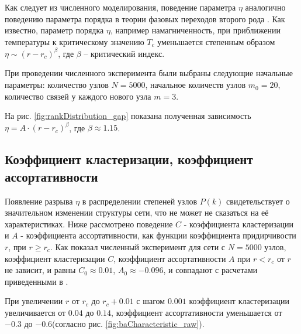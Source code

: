 \documentclass[10pt,aps,pra]{revtex4-1}
\begin{document}
        Как следует из численного моделирования, поведение параметра $\eta$ аналогично поведению параметра порядка в теории фазовых переходов второго рода \cite{Landau}. Как известно, параметр порядка $\eta$, например намагниченность, при приближении температуры к критическому значению $T_c$ уменьшается степенным образом $\eta \sim (r-r_c)^\beta$, где $\beta$ – критический индекс. 

        При проведении численного эксперимента были выбраны следующие начальные параметры: количество узлов $N=5000$, начальное количеств узлов $m_0=20$, количество связей у каждого нового узла $m=3$.

        На рис. \ref{fig:rankDistribution_gap} показана полученная зависимость $\eta = A \cdot {(r-r_c)}^\beta$, где $\beta \approx 1.15$.

    \subsection{Коэффициент кластеризации, коэффициент ассортативности}

        Появление разрыва $\eta$ в распределении степеней узлов $P(k)$ свидетельствует о значительном изменении структуры сети, что не может не сказаться на её характеристиках. Ниже рассмотрено поведение $C$ - коэффициента кластеризации и $A$ - коэффициента ассортативности, как функции коэффициента придирчивости $r$, при $r \geq r_c$. Как показал численный эксперимент для сети с $N=5000$ узлов, коэффициент кластеризации $C$, коэффициент ассортативности $A$ при $r<r_c$ от $r$ не зависит, и равны $C_0 \approx 0.01$, $A_0 \approx -0.096$, и совпадают с расчетами приведенными в \cite{AlBa2,Newman2}. 

        При увеличении $r$ от $r_c$ до $r_c + 0.01$ с шагом $0.001$ коэффициент кластеризации увеличивается от $0.04$ до $0.14$, коэффициент ассортативности уменьшается от $-0.3$ до $-0.6$(согласно рис. \ref{fig:baCharacteristic_raw}).
\end{document}
